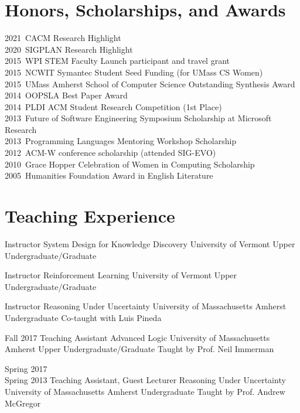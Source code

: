 \documentclass[11pt,a4paper,sans]{moderncv} %
\newcommand{\umass}{University of Massachusetts Amherst}
\newcommand{\uvm}{University of Vermont}
\begin{document}
\section{Honors, Scholarships, and Awards}
  2021~CACM Research Highlight\\
  2020~SIGPLAN Research Highlight\\
  2015~WPI STEM Faculty Launch participant and travel grant\\
  2015~NCWIT Symantec Student Seed Funding (for UMass CS Women)\\
 2015~UMass Amherst School of Computer Science Outstanding Synthesis Award\\
  2014~OOPSLA Best Paper Award\\
  2014~PLDI ACM Student Research Competition (1st Place)\\
  2013~Future of Software Engineering Symposium Scholarship at Microsoft Research\\
  2013~Programming Languages Mentoring Workshop Scholarship\\
  2012~ACM-W conference scholarship (attended SIG-EVO)\\
  2010~Grace Hopper Celebration of Women in Computing Scholarship\\
  2005~Humanities Foundation Award in English Literature\\


  \section{Teaching Experience}

          {Instructor}
          {System Design for Knowledge Discovery}
          {\uvm{}}
          {Upper Undergraduate/Graduate}
          {}

  {Instructor}
  {Reinforcement Learning}
  {\uvm{}}
  {Upper Undergraduate/Graduate}
  {}

    {Instructor}
    {Reasoning Under Uncertainty}
    {\umass{}}
    {Undergraduate}
    {Co-taught with Luis Pineda}

\cventry
{Fall 2017}
{Teaching Assistant}
    {Advanced Logic}
    {\umass{}}
    {Upper Undergraduate/Graduate}
    {Taught by Prof. Neil Immerman}
    

\cventry
    {Spring 2017\\ Spring 2013}
{Teaching Assistant, Guest Lecturer}
    {Reasoning Under Uncertainty}
    {\umass{}}
    {Undergraduate}
    {Taught by Prof. Andrew McGregor}
    
\end{document}
